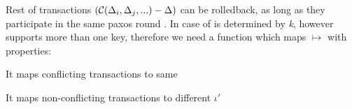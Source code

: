 

Rest of transactions $(\mathcal{C}\text{$(\Delta_{i}, \Delta_{j}, ...)$} - \text{$\Delta$})$ can be rolledback, as long as they participate in the same paxos round \paxosRoundId. In case of \lwt \paxosRoundId is determined by \emph{k}, however \mpt supports more than one key, therefore we need a function which maps \transaction $\mapsto $ \paxosRoundId with properties: 
\begin{enumerate*}
\item It maps conflicting transactions to same \paxosRoundId
\item It maps non-conflicting transactions to different $\iota'$
\end{enumerate*}